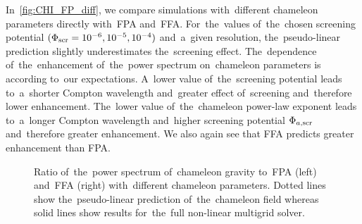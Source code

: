 In~\autoref{fig:CHI_FP_diff}, we compare simulations with~different chameleon parameters directly with~FPA and~FFA. For~the~values of~the~chosen screening potential $(\Phi_{\text{\scriptsize scr}}=10^{-6}, 10^{-5}, 10^{-4})$ and~a~given resolution, the~pseudo-linear prediction slightly underestimates the~screening effect. The~dependence of~the~enhancement of~the~power spectrum on~chameleon parameters is according to~our expectations. A~lower value of~the~screening potential leads to~a~shorter Compton wavelength and~greater effect of~screening and~therefore lower enhancement. The~lower value of~the~chameleon power-law exponent leads to~a~longer Compton wavelength and~higher screening potential $\Phi_{a,\text{\scriptsize scr}}$ and~therefore greater enhancement. We also again see that FFA predicts greater enhancement than FPA.

\begin{figure*}[tb]
  \centering
  \chileft
	\begin{subfigure}{1.2\textwidth}
	\end{subfigure}
	\begin{subfigure}{0.5\textwidth}
	\end{subfigure}%
	\begin{subfigure}{0.5\textwidth}
	\end{subfigure}
  \caption{Ratio of~the~power spectrum of~chameleon gravity to~FPA (left) and~FFA (right) with~different chameleon parameters. Dotted lines show the~pseudo-linear prediction of~the~chameleon field whereas solid lines show results for~the~full non-linear multigrid solver.}
  \label{fig:CHI_FP_diff}
\end{figure*}


